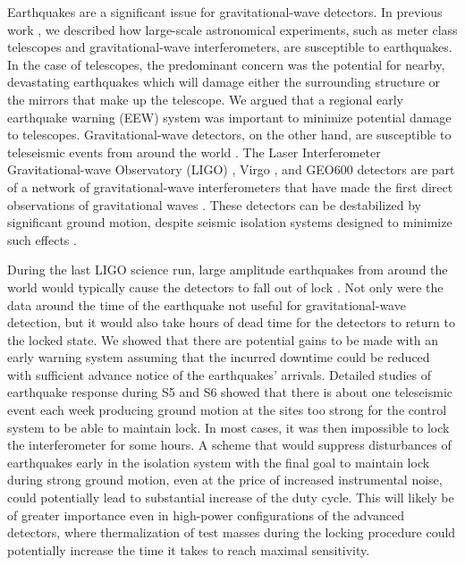 \documentclass[reprint, prl, aps, showpacs]{revtex4-1}
\begin{document}
Earthquakes are a significant issue for gravitational-wave detectors. In previous work \cite{CoSt2015}, we described how large-scale astronomical experiments, such as meter class telescopes and gravitational-wave interferometers, are susceptible to earthquakes. In the case of telescopes, the predominant concern was the potential for nearby, devastating earthquakes which will damage either the surrounding structure or the mirrors that make up the telescope. We argued that a regional early earthquake warning (EEW) \cite{Al2012,KuAl2013a,KuAl2013b,KuHe2014,CoLa2009a,CoLa2009b,BoAl2014,HoKa2008} system was important to minimize potential damage to telescopes. 
Gravitational-wave detectors, on the other hand, are susceptible to teleseismic events from around the world \cite{MaFa2012}. 
The Laser Interferometer Gravitational-wave Observatory (LIGO) \cite{aligo}, Virgo \cite{avirgo}, and GEO600 \cite{Gr2010} detectors are part of a network of gravitational-wave interferometers that have made the first direct observations of gravitational waves \cite{AbEA2016a,AbEA2016e}. These detectors can be destabilized by significant ground motion, despite seismic isolation systems designed to minimize such effects \cite{AbAd2002,StAb2009}.

During the last LIGO science run, large amplitude earthquakes from around the world would typically cause the detectors to fall out of lock \cite{CoSt2015}. Not only were the data around the time of the earthquake not useful for gravitational-wave detection, but it would also take hours of dead time for the detectors to return to the locked state. 
We showed that there are potential gains to be made with an early warning system assuming that the incurred downtime could be reduced with sufficient advance notice of the earthquakes' arrivals.
Detailed studies of earthquake response during S5 and S6 showed that there is about one teleseismic event each week producing ground motion at the sites too strong for the control system to be able to maintain lock. In most cases, it was then impossible to lock the interferometer for some hours. A scheme that would suppress disturbances of earthquakes early in the isolation system with the final goal to maintain lock during strong ground motion, even at the price of increased instrumental noise, could potentially lead to substantial increase of the duty cycle. This will likely be of greater importance even in high-power configurations of the advanced detectors, where thermalization of test masses during the locking procedure could potentially increase the time it takes to reach maximal sensitivity.
\end{document}
